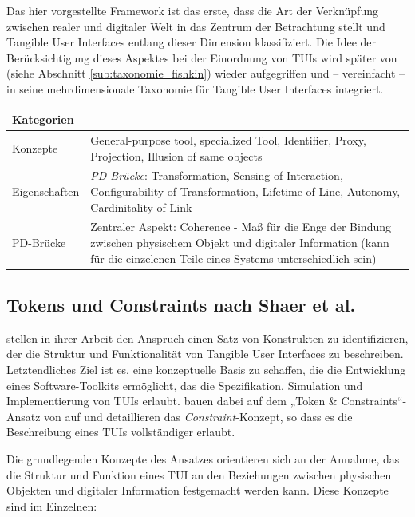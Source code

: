 Das hier vorgestellte Framework ist das erste, dass die Art der Verknüpfung zwischen realer und digitaler Welt in das Zentrum der Betrachtung stellt und Tangible User Interfaces entlang dieser Dimension klassifiziert. Die Idee der Berücksichtigung dieses Aspektes bei der Einordnung von \glspl{TUI} wird später von \citet{Fishkin04} (siehe Abschnitt \ref{sub:taxonomie_fishkin}) wieder aufgegriffen und -- vereinfacht -- in seine mehrdimensionale Taxonomie für Tangible User Interfaces integriert.

\begin{tabular}{| p{3cm} | p{10cm} |}
  \hline
  Kategorien & --- \\ \hline
  Konzepte & General-purpose tool, specialized Tool, Identifier, Proxy, Projection, Illusion of same objects \\ \hline
  Eigenschaften & \emph{PD-Brücke}: Transformation, Sensing of Interaction, Configurability of Transformation, Lifetime of Line, Autonomy, Cardinitality of Link \\ \hline
  PD-Brücke & Zentraler Aspekt: Coherence - Maß für die Enge der Bindung zwischen physischem Objekt und digitaler Information (kann für die einzelenen Teile eines Systems unterschiedlich sein) \\ \hline
\end{tabular} 


\subsection{Tokens und Constraints nach Shaer et al.} %
\label{sub:tokens_und_constraints_nach_shaer_et_al_}

\citet{Shaer04} stellen in ihrer Arbeit den Anspruch einen Satz von Konstrukten zu identifizieren, der die Struktur und Funktionalität von Tangible User Interfaces zu beschreiben. Letztendliches Ziel ist es, eine konzeptuelle Basis zu schaffen, die die Entwicklung eines Software-Toolkits ermöglicht, das die Spezifikation, Simulation und Implementierung von \glspl{TUI} erlaubt. \citet{Shaer04} bauen dabei auf dem „Token \& Constraints“-Ansatz von \citet{Ullmer02} auf und detaillieren das \emph{Constraint}-Konzept, so dass es die Beschreibung eines \glspl{TUI} vollständiger erlaubt. 

Die grundlegenden Konzepte des Ansatzes orientieren sich an der Annahme, das die Struktur und Funktion eines \gls{TUI} an den Beziehungen zwischen physischen Objekten und digitaler Information festgemacht werden kann. Diese Konzepte sind im Einzelnen:

